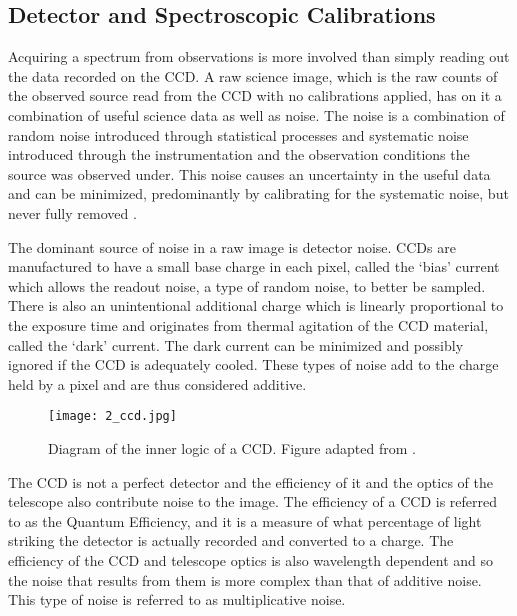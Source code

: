 \subsection{Detector and Spectroscopic Calibrations} \label{subsec:calibration}

Acquiring a spectrum from observations is more involved than simply reading out the data recorded on the \gls{CCD}. A raw science image, which is the raw counts of the observed source read from the \gls{CCD} with no calibrations applied, has on it a combination of useful science data as well as noise. The noise is a combination of random noise introduced through statistical processes and systematic noise introduced through the instrumentation and the observation conditions the source was observed under. This noise causes an uncertainty in the useful data and can be minimized, predominantly by calibrating for the systematic noise, but never fully removed \citep{CCDhandbook}.

The dominant source of noise in a raw image is detector noise. \glspl{CCD} are manufactured to have a small base charge in each pixel, called the `bias' current which allows the readout noise, a type of random noise, to better be sampled. There is also an unintentional additional charge which is linearly proportional to the exposure time and originates from thermal agitation of the \gls{CCD} material, called the `dark' current. The dark current can be minimized and possibly ignored if the \gls{CCD} is adequately cooled. These types of noise add to the charge held by a pixel and are thus considered additive.

\begin{figure}[t]
    \centering
    \texttt{[image: 2\_ccd.jpg]}
    \caption{Diagram of the inner logic of a \gls{CCD}. Figure adapted from \cite{ccd_fig}.}
    \label{fig:ccd_diagram}
\end{figure}

The \gls{CCD} is not a perfect detector and the efficiency of it and the optics of the telescope also contribute noise to the image. The efficiency of a \gls{CCD} is referred to as the Quantum Efficiency, and it is a measure of what percentage of light striking the detector is actually recorded and converted to a charge. The efficiency of the \gls{CCD} and telescope optics is also wavelength dependent and so the noise that results from them is more complex than that of additive noise. This type of noise is referred to as multiplicative noise.

\pagebreak

